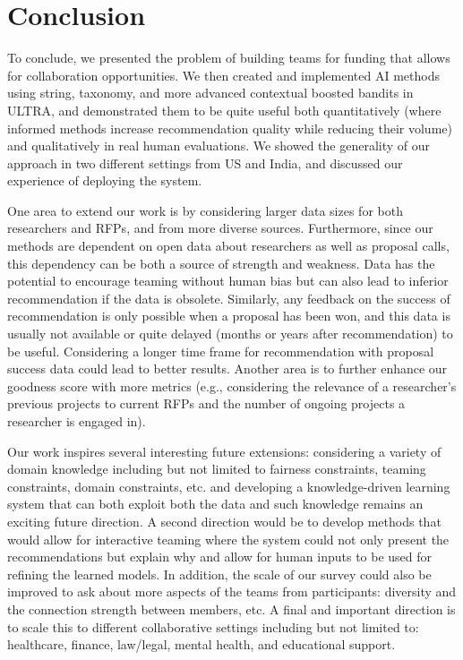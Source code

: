 \section{Conclusion}
To conclude, we presented the problem of building teams for funding that allows for collaboration opportunities. We then created and implemented  AI methods using string, taxonomy, and more advanced contextual boosted bandits in ULTRA, and demonstrated them to be quite useful both quantitatively (where informed methods increase recommendation quality while reducing their volume) and qualitatively in real human evaluations. 
We showed the generality of our approach in two different settings from US and India, and discussed our experience of deploying the system.


One area to extend our work is by considering larger data sizes for both researchers and RFPs, and from more diverse  sources. Furthermore, since our methods are dependent on open data about researchers as well as proposal calls, this dependency can be both a source of strength and weakness. Data has the potential to encourage  teaming without human bias but can also lead to inferior recommendation if the data is obsolete.  %
Similarly, any feedback on the success of recommendation is only possible when a proposal has been won, and this data is usually not available or quite delayed (months or years after recommendation) to be useful. Considering a longer time frame for recommendation with proposal success data could lead to better results. Another area is to further enhance our goodness score with more metrics (e.g., considering the relevance of a researcher's previous projects to current RFPs and the number of ongoing projects a researcher is engaged in).


Our work inspires several interesting future extensions: considering a variety of domain knowledge including but not limited to fairness constraints, teaming constraints, domain constraints, etc. and developing a knowledge-driven learning system that can both exploit both the data and such knowledge remains an exciting future direction. A second direction would be to develop methods that would allow for interactive teaming where the system could not only present the recommendations but explain why and allow for human inputs to be used for refining the learned models. In addition, the scale of our survey could also be improved to ask about more aspects of the teams from participants: diversity and the connection strength between members, etc. A final and important direction is to scale this to different collaborative settings including but not limited to: healthcare, finance, law/legal, mental health, and educational support. 
